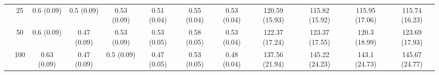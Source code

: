 \documentclass[11pt]{article}
\theoremstyle{definition}
\begin{document}
\begin{table}[H]
\begin{center}
{\begin{tabular}{cc|ccc|ccc|cccc|}
    & 25  & 0.6 (0.09) & 0.5 (0.09) & 0.53 (0.09) & 0.51 (0.04) & 0.55 (0.04) & 0.53 (0.04) & 120.59 (15.93) & 115.82 (15.92) & 115.95 (17.06) & 115.74 (16.23) \\ 
    & 50  & 0.6 (0.09) & 0.47 (0.09) & 0.53 (0.09) & 0.53 (0.05) & 0.58 (0.05) & 0.53 (0.04) & 122.37 (17.24) & 123.37 (17.55) & 120.3 (18.99) & 123.69 (17.93) \\ 
    & 100  & 0.63 (0.09) & 0.47 (0.09) & 0.5 (0.09) & 0.47 (0.05) & 0.53 (0.05) & 0.48 (0.04) & 137.56 (21.94) & 145.22 (24.23) & 143.1 (24.73) & 145.67 (24.77) \\
\end{tabular}}
   \end{center}
      \vspace{-.5cm}
\end{table}
\end{document}
